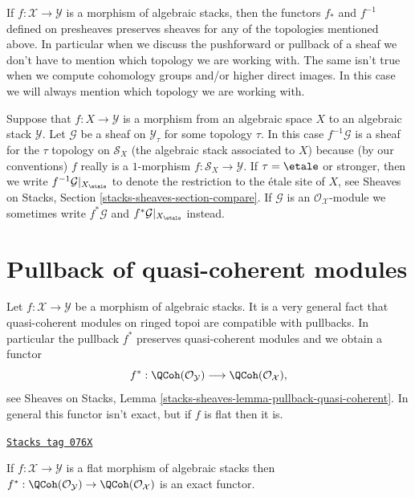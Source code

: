 \medskip\noindent
If $f : \mathcal{X} \to \mathcal{Y}$ is a morphism of algebraic
stacks, then the functors $f_*$ and $f^{-1}$ defined on presheaves
preserves sheaves for any of the topologies mentioned above. In particular
when we discuss the pushforward or pullback of a sheaf we don't have to
mention which topology we are working with. The same isn't true
when we compute cohomology groups and/or higher direct images. In this
case we will always mention which topology we are working with.

\medskip\noindent
Suppose that $f : X \to \mathcal{Y}$ is a morphism from an algebraic
space $X$ to an algebraic stack $\mathcal{Y}$. Let $\mathcal{G}$ be
a sheaf on $\mathcal{Y}_\tau$ for some topology $\tau$. In this case
$f^{-1}\mathcal{G}$ is a sheaf for the $\tau$ topology on $\mathcal{S}_X$
(the algebraic stack associated to $X$) because (by our conventions) $f$
really is a $1$-morphism $f : \mathcal{S}_X \to \mathcal{Y}$.
If $\tau = \etale$ or stronger, then we write
$f^{-1}\mathcal{G}|_{X_\etale}$
to denote the restriction to the \'etale site of $X$, see
Sheaves on Stacks, Section \ref{stacks-sheaves-section-compare}.
If $\mathcal{G}$ is an $\mathcal{O}_\mathcal{X}$-module we sometimes
write $f^*\mathcal{G}$ and $f^*\mathcal{G}|_{X_\etale}$
instead.

\section{Pullback of quasi-coherent modules}
\label{stacks-cohomology-section-pullback}
Let $f : \mathcal{X} \to \mathcal{Y}$ be a morphism of algebraic stacks.
It is a very general fact that quasi-coherent modules on ringed topoi
are compatible with pullbacks. In particular the pullback $f^*$ preserves
quasi-coherent modules and we obtain a functor
$$
f^* :
\QCoh(\mathcal{O}_\mathcal{Y})
\longrightarrow
\QCoh(\mathcal{O}_\mathcal{X}),
$$
see Sheaves on Stacks, Lemma
\ref{stacks-sheaves-lemma-pullback-quasi-coherent}.
In general this functor isn't exact, but if $f$ is flat then it is.

\begin{lemma}
\label{stacks-cohomology-lemma-flat-pullback-quasi-coherent}
\href{https://stacks.math.columbia.edu/tag/076X}{\texttt{Stacks tag 076X}}

If $f : \mathcal{X} \to \mathcal{Y}$ is a flat morphism of algebraic stacks
then $f^* : \QCoh(\mathcal{O}_\mathcal{Y}) \to
\QCoh(\mathcal{O}_\mathcal{X})$ is an exact functor.
\end{lemma}


